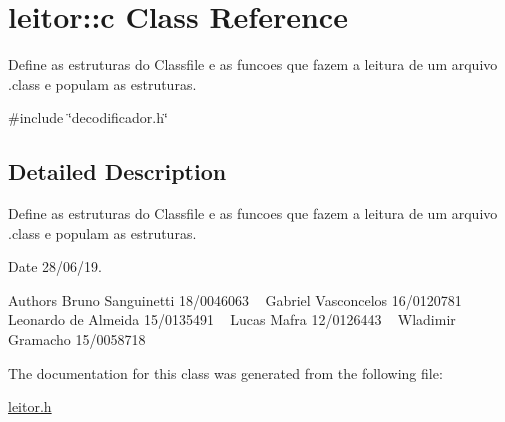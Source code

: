 \hypertarget{classleitor_1_1c}{}\section{leitor\+::c Class Reference}
\label{classleitor_1_1c}


Define as estruturas do Classfile e as funcoes que fazem a leitura de um arquivo .class e populam as estruturas.  




{\ttfamily \#include \char`\"{}decodificador.\+h\char`\"{}}



\subsection{Detailed Description}
Define as estruturas do Classfile e as funcoes que fazem a leitura de um arquivo .class e populam as estruturas. 

\begin{DoxyDate}{Date}
28/06/19.
\end{DoxyDate}
\begin{DoxyAuthor}{Authors}
Bruno Sanguinetti 18/0046063 ~\newline
Gabriel Vasconcelos 16/0120781 ~\newline
Leonardo de Almeida 15/0135491 ~\newline
Lucas Mafra 12/0126443 ~\newline
Wladimir Gramacho 15/0058718 ~\newline

\end{DoxyAuthor}


The documentation for this class was generated from the following file\+:\begin{DoxyCompactItemize}
\item 
\mbox{\hyperlink{leitor_8h}{leitor.\+h}}\end{DoxyCompactItemize}
